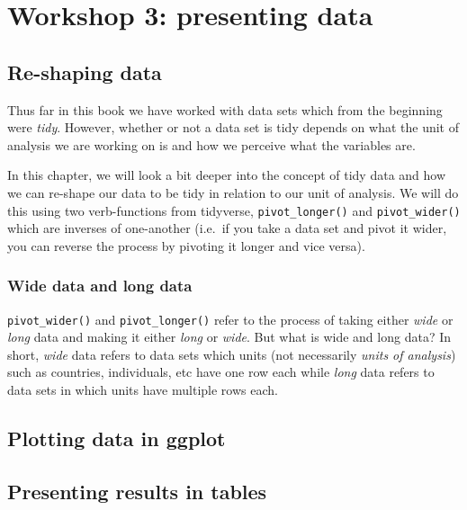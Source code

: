 \documentclass[
]{book}
\begin{document}
\hypertarget{part-workshop-3-presenting-data}{%
\part{Workshop 3: presenting data}\label{part-workshop-3-presenting-data}}

\hypertarget{re-shaping-data}{%
\chapter{Re-shaping data}\label{re-shaping-data}}

Thus far in this book we have worked with data sets which from the beginning were \emph{tidy}. However, whether or not a data set is tidy depends on what the unit of analysis we are working on is and how we perceive what the variables are.

In this chapter, we will look a bit deeper into the concept of tidy data and how we can re-shape our data to be tidy in relation to our unit of analysis. We will do this using two verb-functions from tidyverse, \texttt{pivot\_longer()} and \texttt{pivot\_wider()} which are inverses of one-another (i.e.~if you take a data set and pivot it wider, you can reverse the process by pivoting it longer and vice versa).

\hypertarget{wide-data-and-long-data}{%
\section{Wide data and long data}\label{wide-data-and-long-data}}

\texttt{pivot\_wider()} and \texttt{pivot\_longer()} refer to the process of taking either \emph{wide}
or \emph{long} data and making it either \emph{long} or \emph{wide}. But what is wide and long data?
In short, \emph{wide} data refers to data sets which units (not necessarily \emph{units of analysis}) such as countries, individuals, etc have one row each while \emph{long} data refers to data sets in which units have multiple rows each.

\hypertarget{plotting-data-in-ggplot}{%
\chapter{Plotting data in ggplot}\label{plotting-data-in-ggplot}}

\hypertarget{presenting-results-in-tables}{%
\chapter{Presenting results in tables}\label{presenting-results-in-tables}}
\end{document}
